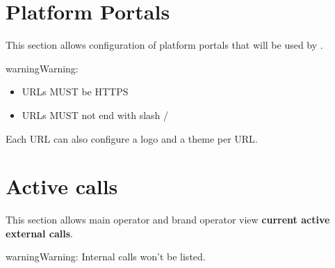 \documentclass[letterpaper,10pt,english]{sphinxmanual}
\begin{document}
\section{Platform Portals}
\label{administration_portal/platform/portals:portals}\label{administration_portal/platform/portals:platform-portals}\label{administration_portal/platform/portals::doc}\label{administration_portal/platform/portals:id1}
This section allows configuration of platform portals that will be used by {\hyperref[administration_portal/platform/main_operators:main\string-operators]{}}.

\begin{notice}{warning}{Warning:}\begin{itemize}
\item {} 
URLs MUST be HTTPS

\item {} 
URLs MUST not end with slash /

\end{itemize}
\end{notice}

Each URL can also configure a logo and a theme per URL.
\label{administration_portal/platform/active_calls:active-calls}

\section{Active calls}
\label{administration_portal/platform/active_calls:call-state}\label{administration_portal/platform/active_calls::doc}\label{administration_portal/platform/active_calls:active-calls}\label{administration_portal/platform/active_calls:id1}
This section allows main operator and brand operator view \textbf{current active external calls}.

\begin{notice}{warning}{Warning:}
Internal calls won't be listed.
\end{notice}
\end{document}
